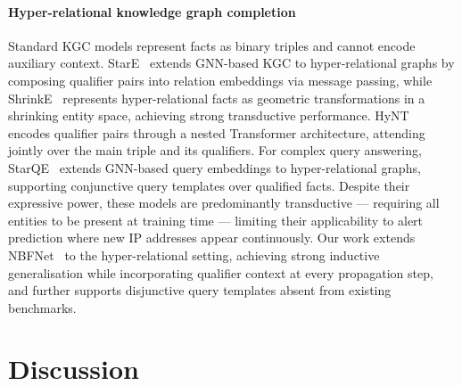 \documentclass[10pt,journal,compsoc]{IEEEtran}
\begin{document}
\paragraph*{Hyper-relational knowledge graph completion}
Standard KGC models represent facts as
binary triples and cannot encode auxiliary context.
StarE~\cite{galkin2020message} extends GNN-based KGC to
hyper-relational graphs by composing qualifier pairs
into relation embeddings via message passing, while
ShrinkE~\cite{xiong2023shrinking} represents hyper-relational
facts as geometric transformations in a shrinking
entity space, achieving strong transductive performance.
HyNT~\cite{chung2023representation} encodes qualifier pairs through a
nested Transformer architecture, attending jointly
over the main triple and its qualifiers. For complex
query answering, StarQE~\cite{alivanistos2021query}
extends GNN-based query embeddings to hyper-relational
graphs, supporting conjunctive query templates over
qualified facts. Despite their expressive power, these
models are predominantly transductive --- requiring all
entities to be present at training time --- limiting
their applicability to alert prediction where new IP
addresses appear continuously. Our work extends
NBFNet~\cite{zhu2021neural} to the hyper-relational
setting, achieving strong inductive generalisation
while incorporating qualifier context at every
propagation step, and further supports disjunctive
query templates absent from existing benchmarks.

\section{Discussion}
\label{sec:discussion}
\end{document}
